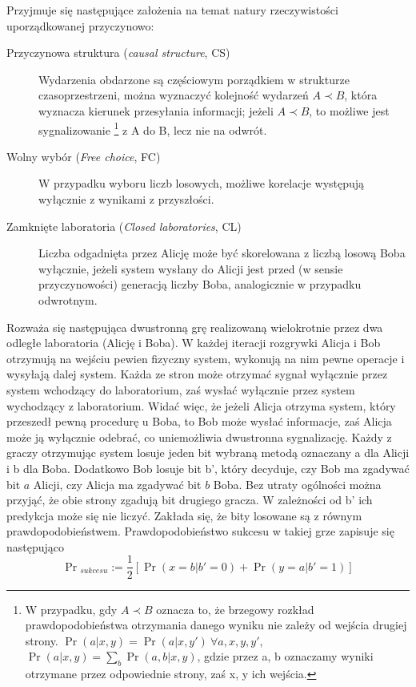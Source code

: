 \documentclass[10pt]{article} %
\begin{document}
Przyjmuje się następujące założenia na temat natury rzeczywistości uporządkowanej przyczynowo:
\begin{description}
	\item[Przyczynowa struktura (\textit{causal structure}, CS)]
	Wydarzenia obdarzone są częściowym porządkiem w strukturze czasoprzestrzeni, można wyznaczyć kolejność wydarzeń $A \prec B$, która wyznacza kierunek przesyłania informacji; jeżeli $A \prec B$, to możliwe jest sygnalizowanie
	\footnote
	{W przypadku, gdy $A \prec B$ oznacza to, że brzegowy rozkład prawdopodobieństwa otrzymania danego wyniku nie zależy od wejścia drugiej strony. $\Pr(a|x, y) = \Pr(a|x, y')~\forall a,x,y,y'$, $\Pr(a|x,y) = \sum_b \Pr(a,b|x,y)$, gdzie przez a, b oznaczamy wyniki otrzymane przez odpowiednie strony, zaś x, y ich wejścia.} 
	z A do B, lecz nie na odwrót.
	\item[Wolny wybór (\textit{Free choice}, FC)]  
	W przypadku wyboru liczb losowych, możliwe korelacje występują wyłącznie z wynikami z przyszłości.
	\item[Zamknięte laboratoria (\textit{Closed laboratories}, CL)] 
	Liczba odgadnięta przez Alicję może być skorelowana z liczbą losową Boba wyłącznie, jeżeli system wysłany do Alicji jest przed (w sensie przyczynowości) generacją liczby Boba, analogicznie w przypadku odwrotnym.	
\end{description}
Rozważa się następująca dwustronną grę realizowaną wielokrotnie przez dwa odległe laboratoria (Alicję i Boba). W każdej iteracji rozgrywki Alicja i Bob otrzymują na wejściu pewien fizyczny system, wykonują na nim pewne operacje i wysyłają dalej system. Każda ze stron może otrzymać sygnał wyłącznie przez 
system wchodzący do laboratorium, zaś wysłać wyłącznie przez system wychodzący z laboratorium. Widać więc, że jeżeli Alicja otrzyma system, który przeszedł pewną procedurę u Boba, to Bob może wysłać informacje, zaś Alicja może ją wyłącznie odebrać, co uniemożliwia dwustronna sygnalizację.
Każdy z graczy otrzymując system losuje jeden bit wybraną metodą oznaczany a dla Alicji i b dla Boba. Dodatkowo Bob losuje bit b', który decyduje, czy Bob ma zgadywać bit $a$ Alicji, czy Alicja ma zgadywać bit $b$ Boba. Bez utraty ogólności można przyjąć, że obie strony zgadują bit drugiego gracza. W zależności od b' ich 
predykcja może się nie liczyć. Zakłada się, że bity losowane są z równym prawdopodobieństwem. Prawdopodobieństwo sukcesu w takiej grze zapisuje się następująco
\begin{equation}
\Pr{}_{sukcesu} := \frac{1}{2} \left[ \Pr(x=b|b'=0) + \Pr(y=a|b' = 1)\right]
\end{equation}
\end{document}
